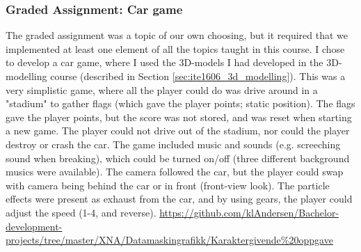 \subsubsection{Graded Assignment: Car game}
\label{sec:comp_grahphics_graded_assignment}
The graded assignment was a topic of our own choosing, but it required that we implemented at least one element of all the topics taught in this course.
I chose to develop a car game, where I used the 3D-models I had developed in the 3D-modelling course (described in Section \ref{sec:ite1606_3d_modelling}).
This was a very simplistic game, where all the player could do was drive around in a "stadium" to gather flags (which gave the player points; static position).
The flags gave the player points, but the score was not stored, and was reset when starting a new game.
The player could not drive out of the stadium, nor could the player destroy or crash the car. 
\vspace{0.5em}\newline
The game included music and sounds (e.g. screeching sound when breaking), which could be turned on/off (three different background musics were available).
The camera followed the car, but the player could swap with camera being behind the car or in front (front-view look). 
The particle effects were present as exhaust from the car, and by using gears, the player could adjust the speed (1-4, and reverse).
\vspace{0.5em}\newline
{} \url{https://github.com/klAndersen/Bachelor-development-projects/tree/master/XNA/Datamaskingrafikk/Karaktergivende%20oppgave}

